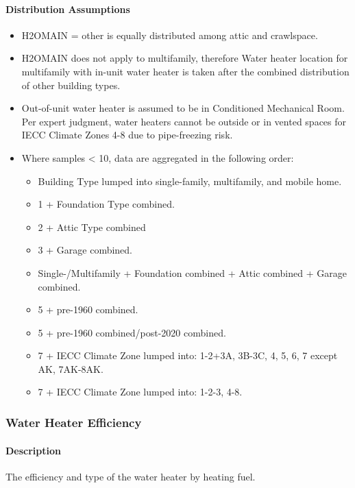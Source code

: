\paragraph{Distribution Assumptions}
\begin{itemize}
\item
  H2OMAIN = other is equally distributed among attic and crawlspace.
\item
  H2OMAIN does not apply to multifamily, therefore Water heater
  location for multifamily with in-unit water heater is taken after the
  combined distribution of other building types.
\item
  Out-of-unit water heater is assumed to be in Conditioned Mechanical
  Room. Per expert judgment, water heaters cannot be outside or in
  vented spaces for IECC Climate Zones 4-8 due to pipe-freezing risk.
\item
  Where samples \textless{} 10, data are aggregated in the following
  order:
  \begin{itemize}
\item
  Building Type lumped into single-family, multifamily, and mobile
  home.
\item
  1 + Foundation Type combined. 
\item 
2 + Attic Type combined
\item
  3 + Garage combined.
\item
  Single-/Multifamily + Foundation combined + Attic combined +
  Garage combined.
\item
  5 + pre-1960 combined.
\item
  5 + pre-1960 combined/post-2020 combined.
\item
  7 + IECC Climate Zone lumped into: 1-2+3A, 3B-3C, 4, 5, 6, 7 except
  AK, 7AK-8AK.
\item
  7 + IECC Climate Zone lumped into: 1-2-3, 4-8.
\end{itemize}
\end{itemize}

\subsubsection{Water Heater Efficiency}\label{water_heater_efficiency}
\paragraph{Description}
The efficiency and type of the water heater by heating fuel.

